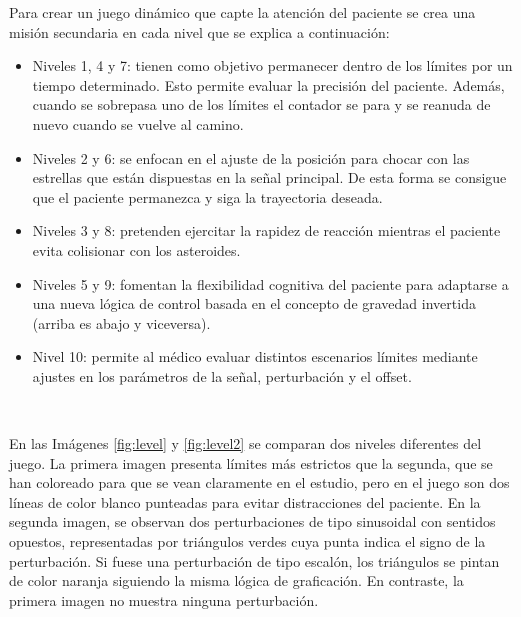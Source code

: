 Para crear un juego dinámico que capte la atención del paciente se crea una misión secundaria en cada nivel que se explica a continuación:
\begin{itemize}
    \item Niveles 1, 4 y 7: tienen como objetivo permanecer dentro de los límites por un tiempo determinado. Esto permite evaluar la precisión del paciente. Además, cuando se sobrepasa uno de los límites el contador se para y se reanuda de nuevo cuando se vuelve al camino.
	\item Niveles 2 y 6: se enfocan en el ajuste de la posición para chocar con las estrellas que están dispuestas en la señal principal. De esta forma se consigue que el paciente permanezca y siga la trayectoria deseada.
	\item Niveles 3 y 8: pretenden ejercitar la rapidez de reacción mientras el paciente evita colisionar con los asteroides.
	\item Niveles 5 y 9: fomentan la flexibilidad cognitiva del paciente para adaptarse a una nueva lógica de control basada en el concepto de gravedad invertida (arriba es abajo y viceversa).
	\item Nivel 10: permite al médico evaluar distintos escenarios límites mediante ajustes en los parámetros de la señal, perturbación y el offset.
\end{itemize}\

En las Imágenes \ref{fig:level} y \ref{fig:level2} se comparan dos niveles diferentes del juego.
La primera imagen presenta límites más estrictos que la segunda, que se han coloreado para que se vean claramente en el estudio, pero en el juego son dos líneas de color blanco punteadas para evitar distracciones del paciente.
En la segunda imagen, se observan dos perturbaciones de tipo sinusoidal con sentidos opuestos, representadas por triángulos verdes cuya punta indica el signo de la perturbación.
Si fuese una perturbación de tipo escalón, los triángulos se pintan de color naranja siguiendo la misma lógica de graficación.
En contraste, la primera imagen no muestra ninguna perturbación.

